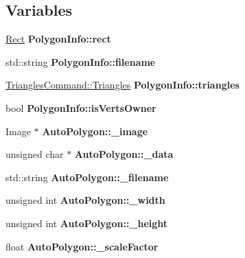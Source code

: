 \subsection*{Variables}
\begin{DoxyCompactItemize}
\item 
\mbox{\label{group____2d_gae866228b8f29e84658e6b2ae9900f43d}} 
\hyperlink{classRect}{Rect} {\bfseries Polygon\+Info\+::rect}
\item 
\mbox{\label{group____2d_ga2c16c4a1931d48b5c3833333b686ee20}} 
std\+::string {\bfseries Polygon\+Info\+::filename}
\item 
\mbox{\label{group____2d_ga32f2f5f29ba9fb32a56acae62c289f42}} 
\hyperlink{structTrianglesCommand_1_1Triangles}{Triangles\+Command\+::\+Triangles} {\bfseries Polygon\+Info\+::triangles}
\item 
\mbox{\label{group____2d_ga4f99f4c922fc0f1a114fca8784553240}} 
bool {\bfseries Polygon\+Info\+::is\+Verts\+Owner}
\item 
\mbox{\label{group____2d_ga148dd22f76ab0fda55e6a3abd03c5a12}} 
Image $\ast$ {\bfseries Auto\+Polygon\+::\+\_\+image}
\item 
\mbox{\label{group____2d_ga3f524d9ecfaa7843d0199a3b5b0a1032}} 
unsigned char $\ast$ {\bfseries Auto\+Polygon\+::\+\_\+data}
\item 
\mbox{\label{group____2d_gae5dfc5f211b3c6cd5ec411d21fd760e6}} 
std\+::string {\bfseries Auto\+Polygon\+::\+\_\+filename}
\item 
\mbox{\label{group____2d_gae47e939aeff393889e90a77f704adfd7}} 
unsigned int {\bfseries Auto\+Polygon\+::\+\_\+width}
\item 
\mbox{\label{group____2d_gaa9678de67d90ded732fca5bbcd494875}} 
unsigned int {\bfseries Auto\+Polygon\+::\+\_\+height}
\item 
\mbox{\label{group____2d_ga1580d982254e1a236d2c852baa72035c}} 
float {\bfseries Auto\+Polygon\+::\+\_\+scale\+Factor}
\item 

\end{DoxyCompactItemize}
